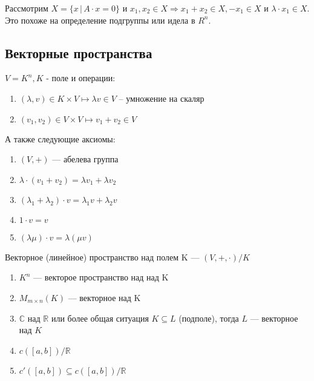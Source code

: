 \begin{remark} 
    Рассмотрим $X = \{ x \, | \, A \cdot x = 0 \}$ и $x_1, x_2 \in X \Longrightarrow x_1 + x_2 \in X, -x_1 \in X $ и $\lambda \cdot x_1 \in X$. Это похоже на определение подгруппы или идела в $R^n$.
\end{remark}

\newpage
\subsection{Векторные пространства}

\begin{definition}
    
    \quad $V = K^n, K$ - поле и операции:
    \begin{enumerate}
        \item $ (\lambda, v) \in K \times V \mapsto \lambda v \in V$ -- умножение на скаляр
        \item $(v_1, v_2) \in V \times V \mapsto v_1 + v_2 \in V$
    \end{enumerate} 
    \quad А также следующие аксиомы:
    \begin{enumerate}
        \item $(V, +)$ --- абелева группа
        \item $\lambda \cdot (v_1 + v_2) = \lambda v_1 + \lambda v_2$
        \item $(\lambda_1 + \lambda_2) \cdot v = \lambda_1 v + \lambda_2 v$
        \item $1 \cdot v = v$
        \item $(\lambda \mu)\cdot v = \lambda (\mu v)$
    \end{enumerate}
\quad Векторное (линейное) пространство над полем K --- $(V, +, \cdot) / K$
\end{definition}

\quad 

\begin{examples}
    \begin{enumerate}
        \item $K^n$ --- векторое пространство над над K 
        \item $M_{m \times n}(K)$ --- векторное над K
        \item $\mathbb{C}$ над $\mathbb{R}$ или более общая ситуация $K \subseteq L$ (подполе), тогда  $L$ --- векторное над $K$
        \item $c([a,b]) / \mathbb{R}$
        \item $c'([a,b]) \subseteq c([a,b]) / \mathbb{R}$
    \end{enumerate}
    
\end{examples}

